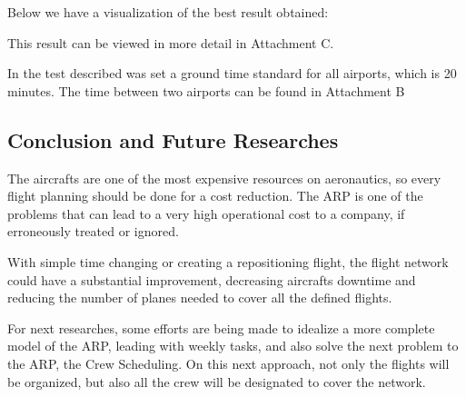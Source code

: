 \documentclass{endm}
\begin{document}
Below we have a visualization of the best result obtained:


This result can be viewed in more detail in Attachment C.

In the test described was set a ground time standard for all airports, which is 20 minutes. The time between two airports can be found in Attachment B

\subsection{Conclusion and Future Researches}

The aircrafts are one of the most expensive resources on aeronautics, so every flight planning should be done for a cost reduction. The ARP is one of the problems that can lead to a very high operational cost to a company, if erroneously treated or ignored.

With simple time changing or creating a repositioning flight, the flight network could have a substantial improvement, decreasing aircrafts downtime and reducing the number of planes needed to cover all the defined flights.

For next researches, some efforts are being made to idealize a more complete model of the ARP, leading with weekly tasks, and also solve the next problem to the ARP, the Crew Scheduling. On this next approach, not only the flights will be organized, but also all the crew will be designated to cover the network.
\end{document}
